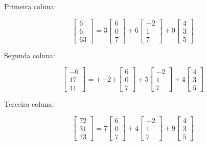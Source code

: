 \documentclass[a4paper,12pt]{article}
\begin{document}
Primeira coluna:

\[
\begin{bmatrix} 6 \\ 6 \\ 63 \end{bmatrix} =
3 \begin{bmatrix} 6 \\ 0 \\ 7 \end{bmatrix} +
6 \begin{bmatrix} -2 \\ 1 \\ 7 \end{bmatrix} +
0 \begin{bmatrix} 4 \\ 3 \\ 5 \end{bmatrix}
\]

Segunda coluna:

\[
\begin{bmatrix} -6 \\ 17 \\ 41 \end{bmatrix} =
(-2) \begin{bmatrix} 6 \\ 0 \\ 7 \end{bmatrix} +
5 \begin{bmatrix} -2 \\ 1 \\ 7 \end{bmatrix} +
4 \begin{bmatrix} 4 \\ 3 \\ 5 \end{bmatrix}
\]

Terceira coluna:

\[
\begin{bmatrix} 72 \\ 31 \\ 73 \end{bmatrix} =
7 \begin{bmatrix} 6 \\ 0 \\ 7 \end{bmatrix} +
4 \begin{bmatrix} -2 \\ 1 \\ 7 \end{bmatrix} +
9 \begin{bmatrix} 4 \\ 3 \\ 5 \end{bmatrix}
\]
\end{document}
